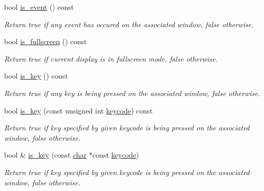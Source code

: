\begin{Indent}
\begin{DoxyCompactItemize}
bool \hyperlink{structcimg__library__suffixed_1_1CImgDisplay_ae4bae55b51a6049ea31ce908ff5d89c5}{is\+\_\+event} () const
\begin{DoxyCompactList}\small\item\em Return {\ttfamily true} if any event has occured on the associated window, {\ttfamily false} otherwise. \end{DoxyCompactList}\item 
\mbox{\label{structcimg__library__suffixed_1_1CImgDisplay_a1de2d56a94961193ef833b502120d67e}} 
bool \hyperlink{structcimg__library__suffixed_1_1CImgDisplay_a1de2d56a94961193ef833b502120d67e}{is\+\_\+fullscreen} () const
\begin{DoxyCompactList}\small\item\em Return {\ttfamily true} if current display is in fullscreen mode, {\ttfamily false} otherwise. \end{DoxyCompactList}\item 
bool \hyperlink{structcimg__library__suffixed_1_1CImgDisplay_ab17db75619b0089c9723541cfe6893be}{is\+\_\+key} () const
\begin{DoxyCompactList}\small\item\em Return {\ttfamily true} if any key is being pressed on the associated window, {\ttfamily false} otherwise. \end{DoxyCompactList}\item 
bool \hyperlink{structcimg__library__suffixed_1_1CImgDisplay_adecafd409ac8a8d62599469dbc7379a3}{is\+\_\+key} (const unsigned int \hyperlink{structcimg__library__suffixed_1_1CImgDisplay_a09c59cb4778b64e31884fccca321839b}{keycode}) const
\begin{DoxyCompactList}\small\item\em Return {\ttfamily true} if key specified by given keycode is being pressed on the associated window, {\ttfamily false} otherwise. \end{DoxyCompactList}\item 
bool \& \hyperlink{structcimg__library__suffixed_1_1CImgDisplay_a48961073143fda753d2ebf18aa697319}{is\+\_\+key} (const \hyperlink{classchar}{char} $\ast$const \hyperlink{structcimg__library__suffixed_1_1CImgDisplay_a09c59cb4778b64e31884fccca321839b}{keycode})
\begin{DoxyCompactList}\small\item\em Return {\ttfamily true} if key specified by given keycode is being pressed on the associated window, {\ttfamily false} otherwise. \end{DoxyCompactList}\item 

\end{DoxyCompactItemize}
\end{Indent}
